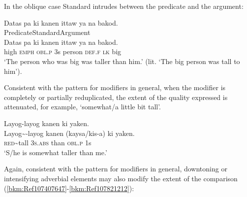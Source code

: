 In  the oblique case Standard intrudes between the predicate and the argument:

\ea
\label{bkm:Ref107822397}
Datas  pa  ki  kanen  ittaw  ya na bakod. \\\smallskip
Predicate\hspace{.5cm}Standard\hspace{.55cm}Argument \\
\gll Datas  pa  ki  kanen  ittaw  ya na bakod. \\
high  \textsc{emph}  \textsc{obl.p}  3s  person  \textsc{def.f} \textsc{lk} big \\
\glt ‘The person who was big was taller than him.’ (lit. ‘The big person was tall to him’).
\z

Consistent with the pattern for modifiers in general, when the modifier is completely or partially reduplicated, the extent of the quality expressed is attenuated, for example, ‘somewhat/a little bit tall’. 

\ea
Layog-layog  kanen  ki  yaken. \\\smallskip \gll Layog\sim{}-layog  kanen  (kaysa/kis-a)  ki  yaken. \\
\textsc{red}\sim{}tall  3\textsc{s.abs}  than  \textsc{obl.p}  1s \\
\glt ‘S/he is somewhat taller than me.’ \\
\z

Again, consistent with the pattern for modifiers in general, downtoning or intensifying adverbial elements may also modify the extent of the comparison (\ref{bkm:Ref107407647}-\ref{bkm:Ref107821212}):

